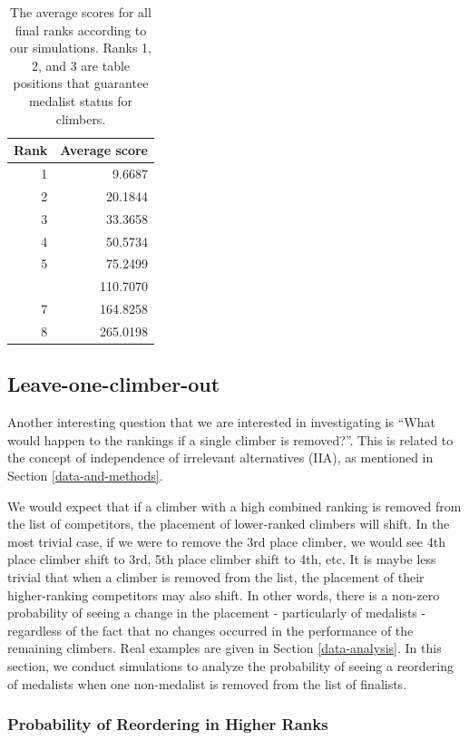 \documentclass[12pt]{article}
\begin{document}
\begin{table}

\caption{\label{tab:unnamed-chunk-11}The average scores for all final ranks according to our simulations. Ranks 1, 2, and 3 are table positions that guarantee medalist status for climbers.}
\centering
\begin{tabular}[t]{rr}
\toprule
Rank & Average score\\
\midrule
1 & 9.6687\\
2 & 20.1844\\
3 & 33.3658\\
4 & 50.5734\\
5 & 75.2499\\
\addlinespace
6 & 110.7070\\
7 & 164.8258\\
8 & 265.0198\\
\bottomrule
\end{tabular}
\end{table}

\hypertarget{leave-one-climber-out}{%
\subsection{Leave-one-climber-out}\label{leave-one-climber-out}}

Another interesting question that we are interested in investigating is
``What would happen to the rankings if a single climber is removed?''.
This is related to the concept of independence of irrelevant
alternatives (IIA), as mentioned in Section \ref{data-and-methods}.

We would expect that if a climber with a high combined ranking is
removed from the list of competitors, the placement of lower-ranked
climbers will shift. In the most trivial case, if we were to remove the
3rd place climber, we would see 4th place climber shift to 3rd, 5th
place climber shift to 4th, etc. It is maybe less trivial that when a
climber is removed from the list, the placement of their higher-ranking
competitors may also shift. In other words, there is a non-zero
probability of seeing a change in the placement - particularly of
medalists - regardless of the fact that no changes occurred in the
performance of the remaining climbers. Real examples are given in
Section \ref{data-analysis}. In this section, we conduct simulations to
analyze the probability of seeing a reordering of medalists when one
non-medalist is removed from the list of finalists.

\hypertarget{probability-of-reordering-in-higher-ranks}{%
\subsubsection{Probability of Reordering in Higher
Ranks}\label{probability-of-reordering-in-higher-ranks}}
\end{document}
